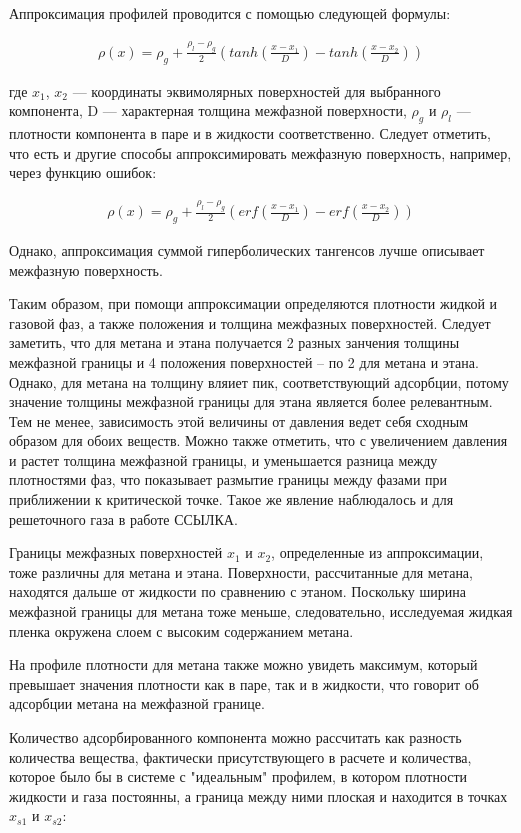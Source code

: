 Аппроксимация профилей проводится с помощью следующей формулы:

\begin{align}
\rho(x) = \rho_g + \frac{\rho_l-\rho_g}{2}(tanh(\frac{x-x_1}{D})-tanh(\frac{x-x_2}{D}))
\end{align}

где $x_1$, $x_2$ — координаты эквимолярных поверхностей для выбранного компонента, D — характерная толщина межфазной поверхности, $\rho_g$ и $\rho_l$ — плотности компонента в паре и в жидкости соответственно. Следует отметить, что есть и другие способы аппроксимировать межфазную поверхность, например, через функцию ошибок:

\begin{align}
\rho(x) = \rho_g + \frac{\rho_l-\rho_g}{2}(erf(\frac{x-x_1}{D})-erf(\frac{x-x_2}{D}))
\end{align}

Однако, аппроксимация суммой гиперболических тангенсов лучше описывает межфазную поверхность.

Таким образом, при помощи аппроксимации определяются плотности жидкой и газовой фаз, а также положения и толщина межфазных поверхностей. Следует заметить, что для метана и этана получается 2 разных занчения толщины межфазной границы и 4 положения поверхностей \--- по 2 для метана и этана. Однако, для метана на толщину вляиет пик, соответствующий адсорбции, потому значение толщины межфазной границы для этана является более релевантным. Тем не менее, зависимость этой величины от давления ведет себя сходным образом для обоих веществ. Можно также отметить, что с увеличением давления и растет толщина межфазной границы, и уменьшается разница между плотностями фаз, что показывает размытие границы между фазами при приближении к критической точке. Такое же явление наблюдалось и для решеточного газа в работе ССЫЛКА.

Границы межфазных поверхностей $x_1$ и $x_2$, определенные из аппроксимации, тоже различны для метана и этана. Поверхности, рассчитанные для метана, находятся дальше от жидкости по сравнению с этаном. Поскольку ширина межфазной границы для метана тоже меньше, следовательно, исследуемая жидкая пленка окружена слоем с высоким содержанием метана.

На профиле плотности для метана также можно увидеть максимум, который превышает значения плотности как в паре, так и в жидкости, что говорит об адсорбции метана на межфазной границе.   

Количество адсорбированного компонента можно рассчитать как разность количества вещества, фактически присутствующего в расчете и количества, которое было бы в системе с "идеальным" профилем, в котором плотности жидкости и газа постоянны, а граница между ними плоская и находится в точках $x_{s1}$ и $x_{s2}$:

